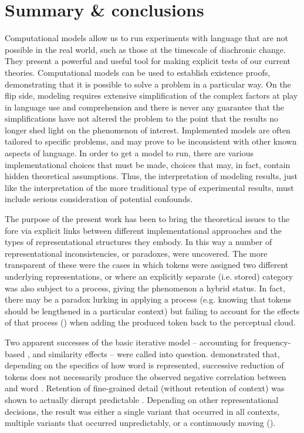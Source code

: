 \section{Summary \& conclusions}

Computational models allow us to run experiments with language that
are not possible in the real world, such as those at the timescale
of diachronic change. They present a powerful and useful tool for making
explicit tests of our current theories. Computational models can be
used to establish existence proofs, demonstrating that it is possible
to solve a problem in a particular way. On the flip side, modeling requires extensive simplification of the complex factors
at play in language use and comprehension and there is never any
guarantee that the simplifications have not altered the problem to
the point that the results no longer shed light on the phenomenon
of interest. Implemented models are often tailored to specific problems,
and may prove to be inconsistent with other known aspects of language.
In order to get a model to run, there are various implementational
choices that must be made, choices that may, in fact, contain hidden
theoretical assumptions. Thus, the interpretation of modeling results,
just like the interpretation of the more traditional type of experimental
results, must include serious consideration of potential confounds. 

The purpose of the present work has been to bring the theoretical
issues to the fore via explicit links between different implementational
approaches and the types of representational structures they embody.
In this way a number of representational inconsistencies, or paradoxes,
were uncovered. The more transparent of these were the cases in which
tokens were assigned two different underlying representations, or
where an explicitly separate (i.e. stored) category was also subject
to a process, giving the phenomenon a hybrid 
status. In fact, there may be a paradox lurking in applying a process
(e.g. knowing that tokens should be lengthened in a particular context)
but failing to account for the effects of that process ()
when adding the produced token back to the perceptual  cloud. 

Two apparent successes of the basic iterative  model – accounting
for frequency-based , and  similarity effects – were
called into question. 
demonstrated that, depending on the specifics of how word 
is represented, successive reduction of tokens does not necessarily
produce the observed negative correlation between  and word
. Retention of fine-grained  detail (without retention
of  context) was shown to actually disrupt predictable 
. Depending on other representational decisions, the result
was either a single variant that occurred in all contexts, multiple
variants that occurred unpredictably, or a continuously moving 
(). 

